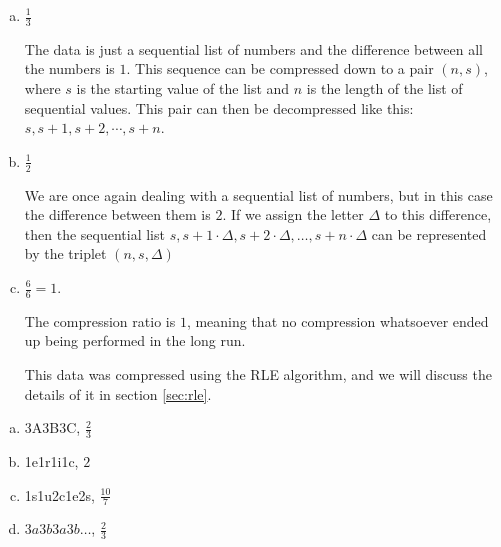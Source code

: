 \begin{Answer}[ref={compression-ratio}]

  \begin{enumerate}[(a)]
  \item $\frac{1}{3}$

    The data is just a sequential list of numbers and the difference
    between all the numbers is $1$. This sequence can be compressed
    down to a pair $(n,s)$, where $s$ is the starting value of the
    list and $n$ is the length of the list of sequential values. This
    pair can then be decompressed like this: $s,s+1,s+2,\cdots,s+n$.


  \item $\frac{1}{2}$

    We are once again dealing with a sequential list of numbers, but
    in this case the difference between them is $2$. If we assign the
    letter $\Delta$ to this difference, then the sequential list $s, s
    + 1 \cdot \Delta, s + 2 \cdot \Delta, \dots, s + n \cdot \Delta$
    can be represented by the triplet $(n,s,\Delta)$

  \item $\frac{6}{6} = 1$.

    The compression ratio is $1$, meaning that no compression
    whatsoever ended up being performed in the long run.

    This data was compressed using the RLE algorithm, and we will
    discuss the details of it in section \ref{sec:rle}.


  \end{enumerate}
\end{Answer}

\begin{Answer}[ref={rle-compression}]

  \begin{enumerate}[(a)]
  \item 3A3B3C, $\frac{2}{3}$
  \item 1e1r1i1c, $2$
  \item 1s1u2c1e2s, $\frac{10}{7}$
  \item $3a3b3a3b\dots$, $\frac{2}{3}$
  \end{enumerate}

\end{Answer}

\FloatBarrier